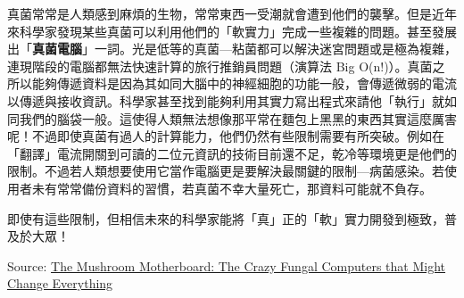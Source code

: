 \documentclass[11pt]{article}
\begin{document}
\begin{frame}
真菌常常是人類感到麻煩的生物，常常東西一受潮就會遭到他們的襲擊。但是近年來科學家發現某些真菌可以利用他們的「軟實力」完成一些複雜的問題。甚至發展出「\textbf{真菌電腦}」一詞。光是低等的真菌—粘菌都可以解決迷宮問題或是極為複雜，連現階段的電腦都無法快速計算的旅行推銷員問題（演算法 Big O(n!)）。真菌之所以能夠傳遞資料是因為其如同大腦中的神經細胞的功能一般，會傳遞微弱的電流以傳遞與接收資訊。科學家甚至找到能夠利用其實力寫出程式來請他「執行」就如同我們的腦袋一般。這使得人類無法想像那平常在麵包上黑黑的東西其實這麼厲害呢！不過即使真菌有過人的計算能力，他們仍然有些限制需要有所突破。例如在「翻譯」電流開關到可讀的二位元資訊的技術目前還不足，乾冷等環境更是他們的限制。不過若人類想要使用它當作電腦更是要解決最關鍵的限制—病菌感染。若使用者未有常常備份資料的習慣，若真菌不幸大量死亡，那資料可能就不負存。

即使有這些限制，但相信未來的科學家能將「真」正的「軟」實力開發到極致，普及於大眾！

Source: \href{https://www.youtube.com/watch?v=5mIWo6dgTmI}{The Mushroom Motherboard: The Crazy Fungal Computers that Might Change Everything}
\end{frame}
\end{document}
